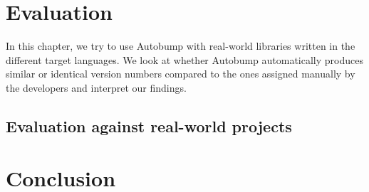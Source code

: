 \documentclass{l4proj}
\begin{document}
\chapter{Evaluation}
\label{Evaluation}

In this chapter, we try to use Autobump with real-world libraries
written in the different target languages. We look at whether Autobump
automatically produces similar or identical version numbers compared
to the ones assigned manually by the developers and interpret our findings.


\section{Evaluation against real-world projects}


\chapter{Conclusion}
\label{Conclusion}
\end{document}
